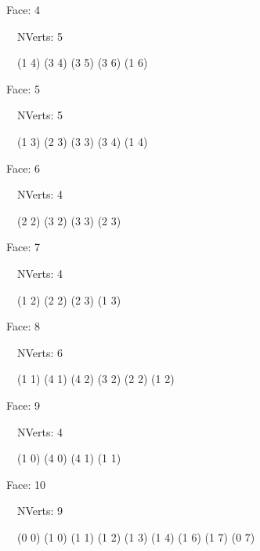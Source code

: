 \documentclass{article}
\begin{document}
    {\footnotesize

    Face: 4

    \   \    NVerts: 5

     \   \   (1 4) (3 4) (3 5) (3 6) (1 6)}

    {\footnotesize

    Face: 5

    \   \    NVerts: 5

     \   \   (1 3) (2 3) (3 3) (3 4) (1 4)}

    {\footnotesize

    Face: 6

    \   \    NVerts: 4

     \   \   (2 2) (3 2) (3 3) (2 3)}

    {\footnotesize

    Face: 7

    \   \    NVerts: 4

     \   \   (1 2) (2 2) (2 3) (1 3)}

    {\footnotesize

    Face: 8

    \   \    NVerts: 6

     \   \   (1 1) (4 1) (4 2) (3 2) (2 2) (1 2)}

    {\footnotesize

    Face: 9

    \   \    NVerts: 4

     \   \   (1 0) (4 0) (4 1) (1 1)}

    {\footnotesize

    Face: 10

    \   \    NVerts: 9

     \   \   (0 0) (1 0) (1 1) (1 2) (1 3) (1 4) (1 6) (1 7) (0 7)}


     \newpage
\end{document}
